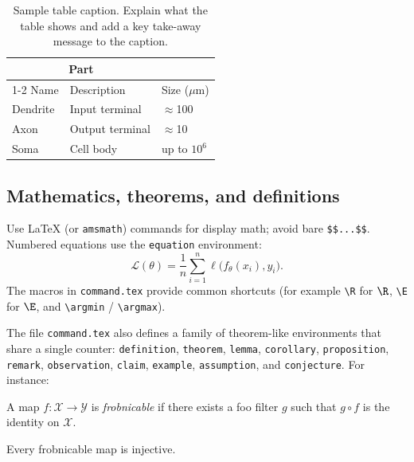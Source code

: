 \begin{table}[t]
  \caption{Sample table caption. Explain what the table shows and add a key
  take-away message to the caption.}
  \label{tab:sample}
  \centering
  \begin{tabular}{lll}
    \toprule
    \multicolumn{2}{c}{Part} \\
    \cmidrule(r){1-2}
    Name     & Description     & Size ($\mu$m) \\
    \midrule
    Dendrite & Input terminal  & $\approx$100  \\
    Axon     & Output terminal & $\approx$10   \\
    Soma     & Cell body       & up to $10^6$  \\
    \bottomrule
  \end{tabular}
\end{table}


\subsection{Mathematics, theorems, and definitions}
\label{sec:math}

Use \LaTeX{} (or \verb+amsmath+) commands for display math; avoid bare
\verb+$$...$$+. Numbered equations use the \verb+equation+ environment:
\begin{equation}
  \label{eq:sample}
  \mathcal{L}(\theta)
  = \frac{1}{n}\sum_{i=1}^{n} \ell\!\big(f_\theta(x_i), y_i\big).
\end{equation}
The macros in \verb+command.tex+ provide common shortcuts (for example
\verb+\R+ for $\R$, \verb+\E+ for $\E$, and \verb+\argmin+ / \verb+\argmax+).

The file \verb+command.tex+ also defines a family of theorem-like environments
that share a single counter: \verb+definition+, \verb+theorem+, \verb+lemma+,
\verb+corollary+, \verb+proposition+, \verb+remark+, \verb+observation+,
\verb+claim+, \verb+example+, \verb+assumption+, and \verb+conjecture+.
For instance:

\begin{definition}[Frobnication]
\label{def:frob}
A map $f:\mathcal{X}\to\mathcal{Y}$ is \emph{frobnicable} if there exists a foo
filter $g$ such that $g\circ f$ is the identity on $\mathcal{X}$.
\end{definition}

\begin{theorem}
\label{thm:frob}
Every frobnicable map is injective.
\end{theorem}

